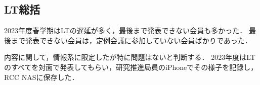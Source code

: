 \subsection*{LT総括}


2023年度春学期はLTの遅延が多く，最後まで発表できない会員も多かった．
最後まで発表できない会員は，定例会議に参加していない会員ばかりであった．

内容に関して，情報系に限定したが特に問題はないと判断する．
2023年度はLTのすべてを対面で発表してもらい，研究推進局員のiPhoneでその様子を記録し，RCC NASに保存した．
